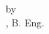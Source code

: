 \begin{addmargin}[-1cm]{-3cm}
\begin{center}
    \spacedallcaps{\mySubtitle}

    \vfill

    \vspace{2cm}

    by \\ \medskip 
    \myName, B. Eng. \\ \medskip

    \vspace*{2cm}

    \submission


\end{center}        
\end{addmargin}
